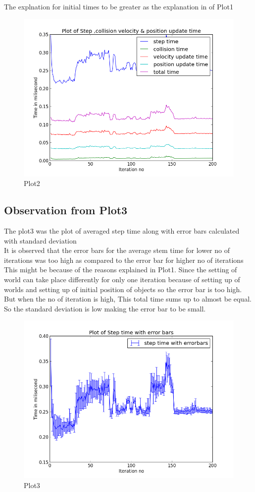 \documentclass[11pt]{article}
\begin{document}
The explnation for initial times to be greater as the explanation in of Plot1
\begin{figure}[!ht]
	\centering
	\caption{Plot2}
		\includegraphics[scale=0.5]{../plots/g17_plot02.png}
\end{figure}
\subsection{Observation from Plot3}
The plot3 was the plot of averaged step time along with error bars calculated with standard deviation\\

It is observed that the error bars for the average stem time for lower no of iterations was too high as compared to the error
 bar for higher no of iterations \\
 
This might be because of the reasons explained in Plot1. Since the setting of world can take place differently for only one iteration because of 
setting up of worlds and setting up of initial position of objects so the error bar is too high. But when the no of iteration is high, This total 
time sums up to almost be equal. So the standard deviation is low making the error bar to be small. 
\begin{figure}[!ht]
	\centering
	\caption{Plot3}
		\includegraphics[scale=0.5]{../plots/g17_plot03.png}
\end{figure}
\end{document}
